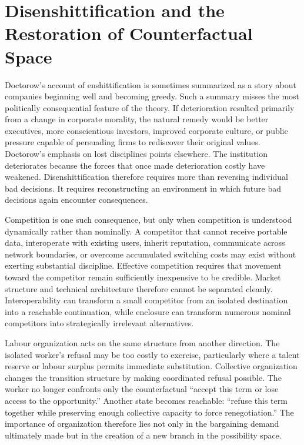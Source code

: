 \documentclass[11pt]{article}
\begin{document}
\section{Disenshittification and the Restoration of Counterfactual Space}

Doctorow's account of enshittification is sometimes summarized as a story about companies beginning well and becoming greedy. Such a summary misses the most politically consequential feature of the theory. If deterioration resulted primarily from a change in corporate morality, the natural remedy would be better executives, more conscientious investors, improved corporate culture, or public pressure capable of persuading firms to rediscover their original values. Doctorow's emphasis on lost disciplines points elsewhere. The institution deteriorates because the forces that once made deterioration costly have weakened. Disenshittification therefore requires more than reversing individual bad decisions. It requires reconstructing an environment in which future bad decisions again encounter consequences.

Competition is one such consequence, but only when competition is understood dynamically rather than nominally. A competitor that cannot receive portable data, interoperate with existing users, inherit reputation, communicate across network boundaries, or overcome accumulated switching costs may exist without exerting substantial discipline. Effective competition requires that movement toward the competitor remain sufficiently inexpensive to be credible. Market structure and technical architecture therefore cannot be separated cleanly. Interoperability can transform a small competitor from an isolated destination into a reachable continuation, while enclosure can transform numerous nominal competitors into strategically irrelevant alternatives.

Labour organization acts on the same structure from another direction. The isolated worker's refusal may be too costly to exercise, particularly where a talent reserve or labour surplus permits immediate substitution. Collective organization changes the transition structure by making coordinated refusal possible. The worker no longer confronts only the counterfactual ``accept this term or lose access to the opportunity.'' Another state becomes reachable: ``refuse this term together while preserving enough collective capacity to force renegotiation.'' The importance of organization therefore lies not only in the bargaining demand ultimately made but in the creation of a new branch in the possibility space.
\end{document}

